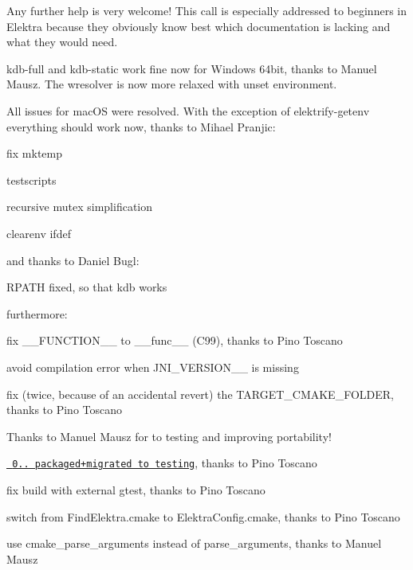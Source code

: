 Any further help is very welcome! This call is especially addressed to beginners in Elektra because they obviously know best which documentation is lacking and what they would need.

{\ttfamily kdb-\/full} and {\ttfamily kdb-\/static} work fine now for Windows 64bit, thanks to Manuel Mausz. The wresolver is now more relaxed with unset environment.

All issues for mac\+OS were resolved. With the exception of elektrify-\/getenv everything should work now, thanks to Mihael Pranjic\+:


\begin{DoxyItemize}
\item fix mktemp
\item testscripts
\item recursive mutex simplification
\item clearenv ifdef
\end{DoxyItemize}

and thanks to Daniel Bugl\+:


\begin{DoxyItemize}
\item R\+P\+A\+TH fixed, so that {\ttfamily kdb} works
\end{DoxyItemize}

furthermore\+:


\begin{DoxyItemize}
\item fix {\ttfamily \+\_\+\+\_\+\+F\+U\+N\+C\+T\+I\+O\+N\+\_\+\+\_\+} to {\ttfamily \+\_\+\+\_\+func\+\_\+\+\_\+} (C99), thanks to Pino Toscano
\item avoid compilation error when J\+N\+I\+\_\+\+V\+E\+R\+S\+I\+O\+N\+\_\+\_ is missing
\item fix (twice, because of an accidental revert) the T\+A\+R\+G\+E\+T\+\_\+\+C\+M\+A\+K\+E\+\_\+\+F\+O\+L\+D\+ER, thanks to Pino Toscano
\end{DoxyItemize}

Thanks to Manuel Mausz for to testing and improving portability!


\begin{DoxyItemize}
\item \href{https://packages.qa.debian.org/e/elektra/news/20150726T155000Z.html}{\texttt{ 0.. packaged+migrated to testing}}, thanks to Pino Toscano
\item fix build with external gtest, thanks to Pino Toscano
\item switch from Find\+Elektra.\+cmake to Elektra\+Config.\+cmake, thanks to Pino Toscano
\item use {\ttfamily cmake\+\_\+parse\+\_\+arguments} instead of {\ttfamily parse\+\_\+arguments}, thanks to Manuel Mausz
\end{DoxyItemize}


